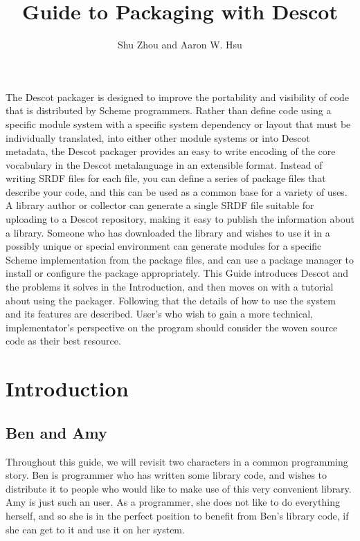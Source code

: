 

\title{Guide to Packaging with Descot}
\author{Shu Zhou and Aaron W. Hsu}

\maketitlepage

\abstract
The Descot packager is designed to improve the portability and visibility 
of code that is distributed
by Scheme programmers. 
Rather than define code using a specific module 
system with a specific system dependency or layout
that must be individually translated, into either other module 
systems or into Descot metadata, the Descot packager provides an easy 
to write encoding of the core vocabulary in the Descot metalanguage in 
an extensible format. Instead of writing SRDF files for each file, 
you can define a series of package files that describe your code,
and this can be used as a common base for a variety of uses. 
A library author or collector can generate a single SRDF file suitable
for uploading to a Descot repository, making it easy to publish the
information about a library.
Someone who has downloaded the library and wishes to use it in a
possibly unique or special environment can generate modules for a
specific Scheme implementation from the package files, and can use a
package manager to install or configure the package appropriately.
This Guide introduces Descot and the problems it solves in the
Introduction, and then moves on with a tutorial about using the
packager. Following that the details of how to use the system and its
features are described. User's who wish to gain a more technical,
implementator's perspective on the program should consider the woven
source code as their best resource.
\endabstract
 
\chapter{Introduction}{}%

\section{Ben and Amy}{}%
Throughout this guide, we will revisit two characters in a common
programming story. Ben is programmer who has written some library
code, and wishes to distribute it to people who would like to make use
of this very convenient library. Amy is just such an user. As a
programmer, she does not like to do everything herself, and so she is
in the perfect position to benefit from Ben's library code, if she can
get to it and use it on her system.

